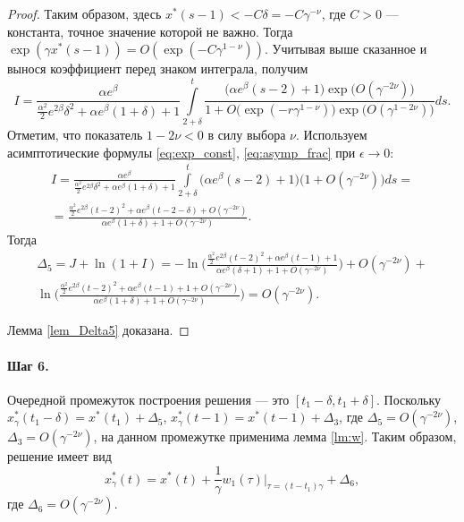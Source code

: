 \begin{proof}
%
%
Таким образом, здесь $x^*(s - 1) < -C \delta = -C \gamma^{-\nu}$, где $C > 0$ --- константа, точное значение которой не важно. Тогда $\exp(\gamma x^*(s - 1))=O(\exp(-C \gamma^{1 - \nu}))$. Учитывая выше сказанное и вынося коэффициент перед знаком интеграла, получим  
\begin{equation*}
	I=\frac{\alpha e^\beta}
	{\frac{\alpha^2}{2}e^{2\beta}\delta^2+\alpha e^{\beta}(1+\delta)+1}
	\int\limits_{2 + \delta}^{t}
	\frac{\big(\alpha e^{\beta}(s-2)+1\big)\exp\big(O(\gamma^{-2\nu})\big)}
	{1+O\big(\exp({-r\gamma^{1-\nu}})\big) \exp\big(O(\gamma^{1-2\nu})\big)}
	ds. 
\end{equation*}
Отметим, что показатель $1-2\nu<0$ в силу выбора $\nu$. Используем асимптотические формулы \eqref{eq:exp_const}, \eqref{eq:asymp_frac} при $\epsilon \to 0$:
%
\begin{multline*}
	I=\frac{\alpha e^\beta}
	{\frac{\alpha^2}{2}e^{2\beta}\delta^2+\alpha e^{\beta}(1+\delta)+1}
	\int\limits_{2 + \delta}^{t}
	\big(\alpha e^{\beta}(s-2)+1\big)\big(1+O(\gamma^{-2\nu})\big)
	ds=
	\\
	= \frac{\frac{\alpha^2}{2} e^{2\beta}(t-2)^2+\alpha e^\beta(t-2-\delta)+O(\gamma^{-2\nu})}
	{\alpha e^{\beta}(1+\delta)+1+O(\gamma^{-2\nu})}.
\end{multline*}
%
Тогда
\begin{multline}
	\Delta_5=J+\ln(1+I)=
	-\ln\Big(\frac{\frac{\alpha^2}{2}e^{2\beta}(t-2)^2+\alpha e^{\beta}(t-1)+1}{\alpha e^{\beta}(\delta+1)+1+O(\gamma^{-2\nu})}\Big)+O(\gamma^{-2\nu})
	+
	\\
	\ln\Big(\frac{\frac{\alpha^2}{2} e^{2\beta}(t-2)^2+\alpha e^\beta(t - 1)+1+O(\gamma^{-2\nu})}
	{\alpha e^{\beta}(1+\delta)+1+O(\gamma^{-2\nu})}\Big)=O(\gamma^{-2\nu}).
\end{multline}        

Лемма \ref{lem_Delta5} доказана.

\end{proof}

\paragraph{Шаг 6.} Очередной промежуток построения решения --- это $[t_1-\delta, t_1+\delta]$. Поскольку $x^*_{\gamma}(t_1 - \delta) = x^*(t_1) + \Delta_5$, $x^*_{\gamma}(t - 1) = x^*(t - 1) + \Delta_3$, где $\Delta_5 = O(\gamma^{-2\nu})$, $\Delta_3 = O(\gamma^{-2\nu})$, на данном промежутке применима лемма \ref{lm:w}. Таким образом, решение имеет вид
\begin{equation}
	\label{eq:sol_6}
	x_{\gamma}^*(t) = x^*(t) + \frac{1}{\gamma} w_1(\tau)\bigg\vert_{\tau=(t - t_1)\gamma} + \Delta_6,
\end{equation}
где $\Delta_6 = O(\gamma^{-2\nu})$.


